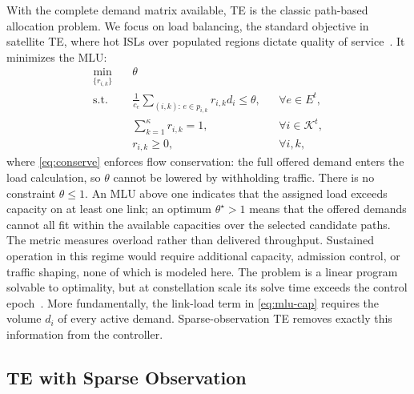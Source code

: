 With the complete demand matrix available, TE is the classic path-based
allocation problem. We focus on load balancing, the standard objective in
satellite TE, where hot ISLs over populated regions dictate quality of
service~\cite{sate,hu2022,wei2024}. It minimizes the MLU:
\begin{align}
    \min_{\{r_{i,k}\}} \quad & \theta \label{eq:mlu} \\
    \text{s.t.} \quad
        & \frac{1}{c_e}\!\!\sum_{(i,k):\, e \in p_{i,k}}\!\! r_{i,k} d_i
          \le \theta,
        && \forall e \in E^t, \label{eq:mlu-cap} \\
        & \sum_{k=1}^{\kappa} r_{i,k} = 1,
        && \forall i \in \mathcal{K}^t, \label{eq:conserve} \\
        & r_{i,k} \ge 0,
        && \forall i, k, \label{eq:mlu-nonneg}
\end{align}
where \cref{eq:conserve} enforces flow conservation: the full offered demand
enters the load calculation, so $\theta$ cannot be lowered by withholding
traffic. There is no constraint $\theta \le 1$. An MLU above one indicates
that the assigned load exceeds capacity on at least one link; an optimum
$\theta^\star>1$ means that the offered demands cannot all fit within the
available capacities over the selected candidate paths. The metric measures
overload rather than delivered throughput. Sustained operation in this
regime would require additional capacity, admission control, or traffic
shaping, none of which is modeled here.
The problem is a linear program solvable to optimality, but at
constellation scale its solve time exceeds the control epoch~\cite{sate}.
More fundamentally, the link-load term in \cref{eq:mlu-cap} requires the
volume $d_i$ of every active demand. Sparse-observation TE removes exactly
this information from the controller.

\subsection{TE with Sparse Observation}
\label{sec:sparse-te}

